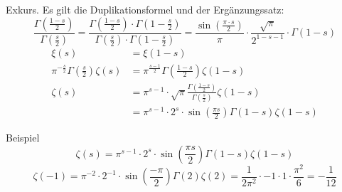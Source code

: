 \begin{frame}
    \begin{block}{Exkurs.}
        Es gilt die Duplikationsformel und der Ergänzungssatz: 
        \[
            \frac{\Gamma\left(\frac{1-s}{2}\right)}{\Gamma\left(\frac{s}{2}\right)} = \frac{\Gamma\left(\frac{1-s}{2}\right) \cdot \Gamma\left(1-\frac{s}{2}\right)}{\Gamma\left(\frac{s}{2}\right)\cdot \Gamma\left(1-\frac{s}{2}\right)} = \frac{\sin\left(\frac{\pi \cdot s}{2}\right)}{\pi} \cdot \frac{\sqrt{\pi}}{2^{1-s-1}}\cdot \Gamma(1-s)
        \]
        \begin{align*}
            \xi(s) &= \xi(1-s)\\
            \pi^{-\frac{s}{2}} \Gamma\left(\frac{s}{2}\right)\zeta(s) &= \pi^\frac{s-1}{2} \Gamma\left(\frac{1-s}{2}\right)\zeta(1-s)\\
            \zeta(s) &= \pi^{s-1}\cdot \sqrt{\pi} \frac{\Gamma\left(\frac{1-s}{2}\right)}{\Gamma\left(\frac{s}{2}\right)}\zeta(1-s)\\
            &= \pi^{s-1} \cdot 2^s \cdot \sin\left(\frac{\pi s}{2}\right)\Gamma(1-s)\zeta(1-s)
        \end{align*}
    \end{block}
\end{frame}
\begin{frame}
    \begin{block}{Beispiel}
        \[
            \zeta(s) = \pi^{s-1} \cdot 2^s \cdot \sin\left(\frac{\pi s}{2}\right)\Gamma(1-s)\zeta(1-s)
        \]
        \[
            \zeta(-1) = \pi^{-2} \cdot 2^{-1} \cdot \sin\left(\frac{-\pi}{2}\right)\Gamma(2)\zeta(2) = \frac{1}{2\pi^2}\cdot -1 \cdot 1 \cdot \frac{\pi^2}{6} = -\frac{1}{12}
        \]
    \end{block}
\end{frame}